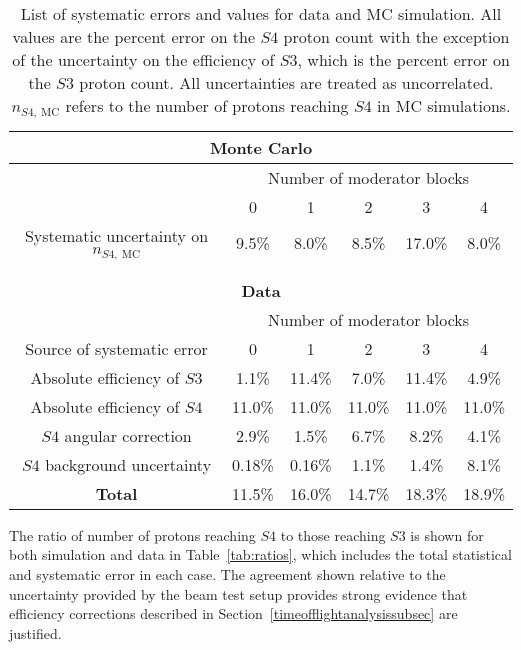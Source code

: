 \begin{table}
  \centering
  \caption{List of systematic errors and values for data and MC simulation. All values are the percent error on the $\mathit{S4}$ proton count with the exception of the uncertainty on the efficiency of $\mathit{S3}$, which is the percent error on the $\mathit{S3}$ proton count. All uncertainties are treated as uncorrelated. $n_{\mathit{S4},~\text{MC}}$ refers to the number of protons reaching $\mathit{S4}$ in MC simulations.}
  \begin{tabular}{c|c c c c c}
    \hline
    \hline
    \multicolumn{6}{c}{\textbf{Monte Carlo}} \\
    \hline
    & \multicolumn{5}{c}{Number of moderator blocks} \\
    & 0 & 1 & 2 & 3 & 4 \\
    \hline
    Systematic uncertainty on $n_{\mathit{S4},~\text{MC}}$ & 9.5\% & 8.0\% & 8.5\% & 17.0\% & 8.0\% \\
    \hline
    \multicolumn{6}{c}{} \\
    \multicolumn{6}{c}{} \\
    \hline
    \hline
    \multicolumn{6}{c}{\textbf{Data}} \\
    \hline
    & \multicolumn{5}{c}{Number of moderator blocks} \\
    Source of systematic error & 0 & 1 & 2 & 3 & 4 \\
    \hline
    Absolute efficiency of $\mathit{S3}$ & 1.1\% & 11.4\% & 7.0\% & 11.4\% & 4.9\% \\
    Absolute efficiency of $\mathit{S4}$ & 11.0\% & 11.0\% & 11.0\% & 11.0\% & 11.0\% \\ 
    $\mathit{S4}$ angular correction & 2.9\% & 1.5\% & 6.7\% & 8.2\% & 4.1\% \\
    $\mathit{S4}$ background uncertainty & 0.18\% & 0.16\% & 1.1\% & 1.4\% & 8.1\% \\
    \hline
    \textbf{Total} & 11.5\% & 16.0\% & 14.7\% & 18.3\% & 18.9\% \\
    \hline 
  \end{tabular}
  \label{tab:systematics}
\end{table}

The ratio of number of protons reaching $\mathit{S4}$ to those reaching $\mathit{S3}$ is shown for both simulation and data in Table~\ref{tab:ratios}, which includes the total statistical and systematic error in each case.
The agreement shown relative to the uncertainty provided by the beam test setup provides strong evidence that efficiency corrections described in Section~\ref{timeofflightanalysissubsec} are justified.

